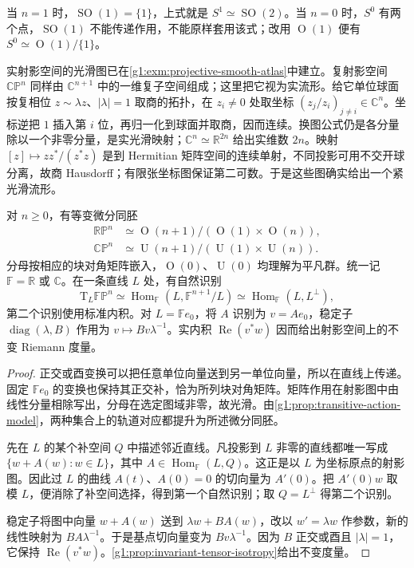 当 \(n=1\) 时，\(\operatorname{SO}(1)=\{1\}\)，上式就是 \(S^1\simeq\operatorname{SO}(2)\)。当 \(n=0\) 时，\(S^0\) 有两个点，\(\operatorname{SO}(1)\) 不能传递作用，不能原样套用该式；改用 \(\operatorname{O}(1)\) 便有 \(S^0\simeq\operatorname{O}(1)/\{1\}\)。

\ProseParagraphBreak

实射影空间的光滑图已在\cref{g1:exm:projective-smooth-atlas}中建立。复射影空间 \(\mathbb{CP}^n\) 同样由 \(\mathbb C^{n+1}\) 中的一维复子空间组成；这里把它视为实流形。给它单位球面按复相位 \(z\sim\lambda z\)、\(|\lambda|=1\) 取商的拓扑，在 \(z_i\ne0\) 处取坐标 \((z_j/z_i)_{j\ne i}\in\mathbb C^n\)。坐标逆把 \(1\) 插入第 \(i\) 位，再归一化到球面并取商，因而连续。换图公式仍是各分量除以一个非零分量，是实光滑映射；\(\mathbb C^n\simeq\mathbb R^{2n}\) 给出实维数 \(2n\)。映射 \([z]\mapsto zz^*/(z^*z)\) 是到 Hermitian 矩阵空间的连续单射，不同投影可用不交开球分离，故商 Hausdorff；有限张坐标图保证第二可数。于是这些图确实给出一个紧光滑流形。

\begin{proposition}\label{g1:prop:projective-homogeneous-models}
	对 \(n\geq0\)，有等变微分同胚
	\begin{align*}
		\mathbb{RP}^n&\simeq\operatorname{O}(n+1)/(\operatorname{O}(1)\times\operatorname{O}(n)),\\
		\mathbb{CP}^n&\simeq\operatorname{U}(n+1)/(\operatorname{U}(1)\times\operatorname{U}(n)).
	\end{align*}
	分母按相应的块对角矩阵嵌入，\(\operatorname{O}(0)\)、\(\operatorname{U}(0)\) 均理解为平凡群。统一记 \(\mathbb F=\mathbb R\) 或 \(\mathbb C\)。在一条直线 \(L\) 处，有自然识别
	\[
		\mathrm{T}_L\mathbb{FP}^n\simeq\operatorname{Hom}_{\mathbb F}(L,\mathbb F^{n+1}/L)
		\simeq\operatorname{Hom}_{\mathbb F}(L,L^\perp),
	\]
	第二个识别使用标准内积。对 \(L=\mathbb Fe_0\)，将 \(A\) 识别为 \(v=Ae_0\)，稳定子 \(\operatorname{diag}(\lambda,B)\) 作用为 \(v\mapsto Bv\lambda^{-1}\)。实内积 \(\operatorname{Re}(v^*w)\) 因而给出射影空间上的不变 Riemann 度量。
\end{proposition}
\begin{proof}
	正交或酉变换可以把任意单位向量送到另一单位向量，所以在直线上传递。固定 \(\mathbb Fe_0\) 的变换也保持其正交补，恰为所列块对角矩阵。矩阵作用在射影图中由线性分量相除写出，分母在选定图域非零，故光滑。由\cref{g1:prop:transitive-action-model}，两种集合上的轨道对应都提升为所述微分同胚。

	先在 \(L\) 的某个补空间 \(Q\) 中描述邻近直线。凡投影到 \(L\) 非零的直线都唯一写成 \(\{w+A(w):w\in L\}\)，其中 \(A\in\operatorname{Hom}_{\mathbb F}(L,Q)\)。这正是以 \(L\) 为坐标原点的射影图。因此过 \(L\) 的曲线 \(A(t)\)、\(A(0)=0\) 的切向量为 \(A'(0)\)。把 \(A'(0)w\) 取模 \(L\)，便消除了补空间选择，得到第一个自然识别；取 \(Q=L^\perp\) 得第二个识别。

	稳定子将图中向量 \(w+A(w)\) 送到 \(\lambda w+B A(w)\)，改以 \(w'=\lambda w\) 作参数，新的线性映射为 \(B A\lambda^{-1}\)。于是基点切向量变为 \(Bv\lambda^{-1}\)。因为 \(B\) 正交或酉且 \(|\lambda|=1\)，它保持 \(\operatorname{Re}(v^*w)\)。\cref{g1:prop:invariant-tensor-isotropy}给出不变度量。
\end{proof}

